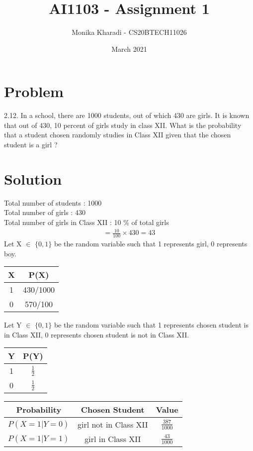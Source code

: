 \documentclass[journal,12pt,two column]{IEEEtran}
\title{AI1103 - Assignment 1}
\author{Monika Kharadi - CS20BTECH11026}
\date{March 2021}
\begin{document}
\maketitle
\section*{\large\textbf{Problem}}

2.12. In a school, there are 1000 students, out of which 430 are girls. It is known that out of 430, 10 percent of girls study in class XII. What is the probability that a student chosen randomly studies in Class XII given that the chosen student is a girl ?
{\section*{\large\textbf{Solution}}}
Total number of students : 1000 \\
Total number of girls : 430  \\
Total number of girls in Class XII : 10 \% of total girls 
\begin{align}
=\frac{10}{100}\times 430 =43
\end{align}
Let X $\in$ $\{0,1\}$ be the random variable such that 1 represents girl, 0 represents boy.\\
\begin{center}
\begin{tabular}{|c|c|}
    \hline
    X & P(X) \\
    \hline
    1 & 430/1000\\
    \hline
    0 & 570/100\\
    \hline
    \end{tabular}
\end{center}
Let Y $\in$ $\{0,1\}$ be the random variable such that 1 represents chosen student is in Class XII, 0 represents chosen student is not in Class XII.
\begin{center}
    \begin{tabular}{|c|c|}
    \hline
    Y & P(Y)\\
    \hline
    1 & $\frac{1}{2}$ \\
    \hline
    0 & $\frac{1}{2}$\\
    \hline
    \end{tabular}
\end{center} 
\begin{center}
    \begin{tabular}{|c|c|c|}
    \hline
    Probability & Chosen Student & Value\\
    \hline
    $P(X=1\vert Y=0)$ & girl not in Class XII & $\frac{387}{1000}$\\
    \hline
    $ P(X=1\vert Y=1)$ & girl in Class XII & $\frac{43}{1000}$ \\
    \hline
    \end{tabular}
\end{center} \\ 
\end{document}
